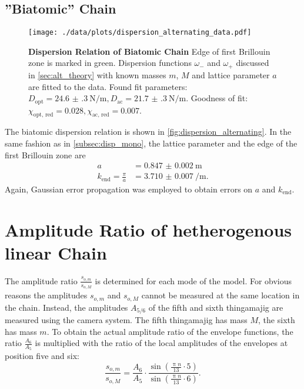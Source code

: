 \subsection{''Biatomic'' Chain}
\begin{figure}
	\centering
	\texttt{[image: ./data/plots/dispersion\_alternating\_data.pdf]}
	\caption[Dispersion Relation of Biatomic Chain]{\textbf{Dispersion Relation of Biatomic Chain} Edge of first Brillouin zone is marked in green.
	Dispersion functions $\omega_{-}$ and $\omega_{+}$ discussed in \autoref{sec:alt_theory} with known masses $m$, $M$ and lattice parameter $a$ are fitted to the data.
	Found fit parameters: $D_\text{opt}=\SI{24.6(3)}{\newton\per\meter}, D_\text{ac}=\SI{21.7(3)}{\newton\per\meter}$. Goodness of fit: $\chi_\text{opt, red}=\num{0.028}, \chi_\text{ac, red}=\num{0.007}$.}
	\label{fig:dispersion_single}
\end{figure}
The biatomic dispersion relation is shown in \autoref{fig:dispersion_alternating}.
In the same fashion as in \autoref{subsec:disp_mono}, the lattice parameter and the edge of the first Brillouin zone are
\begin{align*}
	a &= \SI{0.847(2)}{\meter} \\
	k_\text{end} = \frac{\pi}{a} &= \SI{3.710(7)}{\per\meter}.
\end{align*}
Again, Gaussian error propagation was employed to obtain errors on $a$ and $k_\text{end}$.

\section{Amplitude Ratio of hetherogenous linear Chain}
The amplitude ratio $\frac{s_{o,m}}{s_{o,M}}$ is determined for each mode of the model.
For obvious reasons the amplitudes $s_{o,m}$ and $s_{o,M}$ cannot be measured at the same location in the chain.
Instead, the amplitudes $A_{5/6}$ of the fifth and sixth thingamajig are measured using the camera system.
The fifth thingamajig has mass $M$, the sixth has mass $m$.
To obtain the actual amplitude ratio of the envelope functions, the ratio $\frac{A_{6}}{A_{5}}$ is multiplied with the ratio of the local amplitudes of the envelopes at position five and six:
\begin{equation*}
	\frac{s_{o,m}}{s_{o,M}} = \frac{A_{6}}{A_{5}} \cdot \frac{\sin(\frac{\uppi n}{13} \cdot 5)}{\sin(\frac{\uppi n}{13} \cdot 6)}.
\end{equation*}



